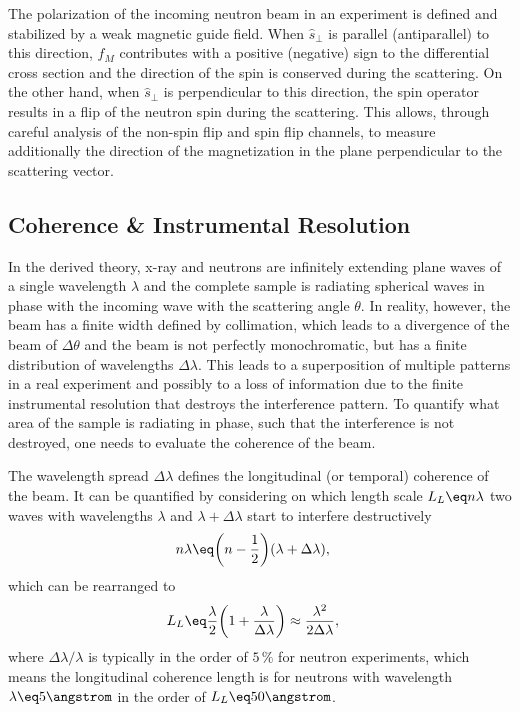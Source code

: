 \documentclass[\main/dresen_thesis.tex]{subfiles}
\begin{document}
The polarization of the incoming neutron beam in an experiment is defined and stabilized by a weak magnetic guide field.
When $\hat{s}_\perp$ is parallel (antiparallel) to this direction, $f_M$ contributes with a positive (negative) sign to the differential cross section and the direction of the spin is conserved during the scattering.
On the other hand, when $\hat{s}_\perp$ is perpendicular to this direction, the spin operator results in a flip of the neutron spin during the scattering.
This allows, through careful analysis of the non-spin flip and spin flip channels, to measure additionally the direction of the magnetization in the plane perpendicular to the scattering vector.



\subsection{Coherence \& Instrumental Resolution}\label{sec:theoreticalBackground:scattering:CoherenceInstrumentalResolution}
In the derived theory, x-ray and neutrons are infinitely extending plane waves of a single wavelength $\lambda$ and the complete sample is radiating spherical waves in phase with the incoming wave with the scattering angle $\theta$.
In reality, however, the beam has a finite width defined by collimation, which leads to a divergence of the beam of $\Delta \theta$ and the beam is not perfectly monochromatic, but has a finite distribution of wavelengths $\Delta \lambda$.
This leads to a superposition of multiple patterns in a real experiment and possibly to a loss of information due to the finite instrumental resolution that destroys the interference pattern.
To quantify what area of the sample is radiating in phase, such that the interference is not destroyed, one needs to evaluate the coherence of the beam.

The wavelength spread $\Delta \lambda$ defines the longitudinal (or temporal) coherence of the beam. It can be quantified by considering on which length scale $L_L \eq n \lambda$ two waves with wavelengths $\lambda$ and $\lambda + \Delta \lambda$ start to interfere destructively
\begin{align}
  n\lambda \eq& \biggl(n - \frac{1}{2} \biggr)(\lambda + \Delta \lambda),
\end{align}
which can be rearranged to
\begin{align}
  L_L \eq& \frac{\lambda}{2} \biggl(1 + \frac{\lambda}{\Delta \lambda} \biggr) \approx \frac{\lambda^2}{2 \Delta \lambda},
\end{align}
where $\Delta \lambda / \lambda$ is typically in the order of $5\, \%$ for neutron experiments, which means the longitudinal coherence length is for neutrons with wavelength $\lambda \eq 5 \angstrom$ in the order of $L_L \eq 50 \angstrom$.
\end{document}
